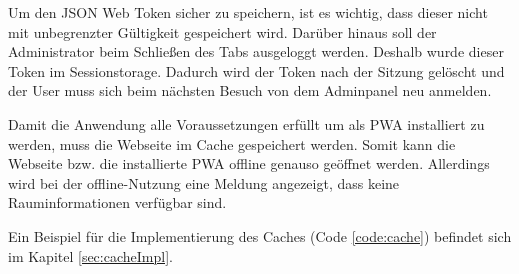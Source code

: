 
Um den JSON Web Token sicher zu speichern, ist es wichtig, dass dieser nicht mit unbegrenzter Gültigkeit gespeichert wird. Darüber hinaus soll der Administrator beim Schließen des Tabs ausgeloggt werden. Deshalb wurde dieser Token im Sessionstorage. Dadurch wird der Token nach der Sitzung gelöscht und der User muss sich beim nächsten Besuch von dem Adminpanel neu anmelden.


Damit die Anwendung alle Voraussetzungen erfüllt um als PWA installiert zu werden, muss die Webseite im Cache gespeichert werden. Somit kann die Webseite bzw. die installierte PWA offline genauso geöffnet werden. Allerdings wird bei der offline-Nutzung eine Meldung angezeigt, dass keine Rauminformationen verfügbar sind.

Ein Beispiel für die Implementierung des Caches (Code \ref{code:cache}) befindet sich im Kapitel \ref{sec:cacheImpl}.
 